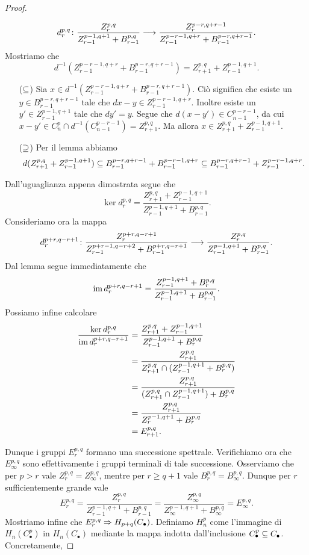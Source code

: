 \begin{proof}
\begin{enumerate}
$$
\map{d^{p,q}_r}{\frac{Z^{p,q}_r}{Z^{p-1,q+1}_{r-1}+B^{p,q}_{r-1}}}{\frac{Z^{p-r,q+r-1}_r}{Z^{p-r-1,q+r}_{r-1}+B^{p-r,q+r-1}_{r-1}}}.
$$
Mostriamo che 
$$
d^{-1}(Z^{p-r-1,q+r}_{r-1}+B^{p-r,q+r-1}_{r-1})=Z^{p,q}_{r+1}+Z^{p-1,q+1}_{r-1}.
$$
\begin{itemize}
\item[($\subseteq$)] Sia $x\in d^{-1}(Z^{p-r-1,q+r}_{r-1}+B^{p-r,q+r-1}_{r-1})$. Ciò significa che esiste un $y\in B^{p-r,q+r-1}_{r-1}$ tale che $dx-y\in Z^{p-r-1,q+r}_{r-1}$. Inoltre esiste un $y'\in Z^{p-1,q+1}_{r-1}$ tale che $dy'=y$. Segue che $d(x-y')\in C^{p-r-1}_{n-1}$, da cui $x-y'\in C^p_n\cap d^{-1}(C^{p-r-1}_{n-1})=Z^{p,q}_{r+1}$. Ma allora $x\in Z^{p,q}_{r+1}+Z^{p-1,q+1}_{r-1}$.
\item[($\supseteq$)] Per il lemma abbiamo
$$
d(Z^{p,q}_{r+1}+Z^{p-1,q+1}_{r-1})\subseteq B^{p-r,q+r-1}_{r-1}+B^{p-r-1,q+r}_{r-1}\subseteq B^{p-r,q+r-1}_{r-1}+Z^{p-r-1,q+r}_{r-1}.
$$
\end{itemize}
Dall'uguaglianza appena dimostrata segue che
$$
\ker d^{p,q}_r=\frac{Z^{p,q}_{r+1}+Z^{p-1,q+1}_{r-1}}{Z^{p-1,q+1}_{r-1}+B^{p,q}_{r-1}}.
$$
Consideriamo ora la mappa
$$
\map{d^{p+r,q-r+1}_r}{\frac{Z^{p+r,q-r+1}_r}{Z^{p+r-1,q-r+2}_{r-1}+B^{p+r,q-r+1}_{r-1}}}{\frac{Z^{p,q}_r}{Z^{p-1,q+1}_{r-1}+B^{p,q}_{r-1}}}.
$$
Dal lemma segue immediatamente che
$$
\operatorname{im} d^{p+r,q-r+1}_r=\frac{Z^{p-1,q+1}_{r-1}+B^{p,q}_r}{Z^{p-1,q+1}_{r-1}+B^{p,q}_{r-1}}.
$$
Possiamo infine calcolare
\begin{align*}
\frac{\ker d^{p,q}_r}{\operatorname{im} d^{p+r,q-r+1}_r}&=\frac{Z^{p,q}_{r+1}+Z^{p-1,q+1}_{r-1}}{Z^{p-1,q+1}_{r-1}+B^{p,q}_r}\\
&=\frac{Z^{p,q}_{r+1}}{Z^{p,q}_{r+1}\cap(Z^{p-1,q+1}_{r-1}+B^{p,q}_r)}\\
&=\frac{Z^{p,q}_{r+1}}{(Z^{p,q}_{r+1}\cap Z^{p-1,q+1}_{r-1})+B^{p,q}_r}\\
&=\frac{Z^{p,q}_{r+1}}{Z^{p-1,q+1}_r+B^{p,q}_r}\\
&=E^{p,q}_{r+1}.
\end{align*}
\end{enumerate}
Dunque i gruppi $E^{p,q}_r$ formano una successione spettrale. Verifichiamo ora che $E^{p,q}_\infty$ sono effettivamente i gruppi terminali di tale successione. Osserviamo che per $p>r$ vale $Z^{p,q}_r=Z^{p,q}_\infty$, mentre per $r\ge q+1$ vale $B^{p,q}_r=B^{p,q}_\infty$. Dunque per $r$ sufficientemente grande vale
$$
E^{p,q}_r=\frac{Z^{p,q}_r}{Z^{p-1,q+1}_{r-1}+B^{p,q}_{r-1}}=\frac{Z^{p,q}_\infty}{Z^{p-1,q+1}_{\infty}+B^{p,q}_\infty}=E^{p,q}_\infty.
$$
Mostriamo infine che $E^{p,q}_r\Rightarrow H_{p+q}(C_\bullet)$. Definiamo $H^p_n$ come l'immagine di $H_n(C^p_\bullet)$ in $H_n(C_\bullet)$ mediante la mappa indotta dall'inclusione $C^p_\bullet\subseteq C_\bullet$. Concretamente,

\end{proof}
